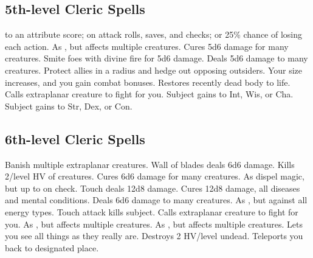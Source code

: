 \subsection{5th-level Cleric Spells}
\begin{spelllist}
    to an attribute score;  on attack rolls, saves, and checks; or 25\% chance of losing each action.
   As , but affects multiple creatures.
   Cures 5d6 damage for many creatures.
   Smite foes with divine fire for 5d6 damage.
   Deals 5d6 damage to many creatures.
   Protect allies in a \areamed radius and hedge out opposing outsiders.
   Your size increases, and you gain combat bonuses.
   Restores recently dead body to life.
   Calls extraplanar creature to fight for you.
   Subject gains  to Int, Wis, or Cha.
   Subject gains  to Str, Dex, or Con.
\end{spelllist}

\subsection{6th-level Cleric Spells}
\begin{spelllist}
   Banish multiple extraplanar creatures. 
   Wall of blades deals 6d6 damage.
  \M Kills 2/level HV of creatures.
   Cures 6d6 damage for many creatures.
   As dispel magic, but up to  on check.
   Touch deals 12d8 damage.
   Cures 12d8 damage, all diseases and mental conditions.
   Deals 6d6 damage to many creatures.
   As , but against all energy types.
   Touch attack kills subject.
   Calls extraplanar creature to fight for you.
   As , but affects multiple creatures.
   As , but affects multiple creatures.
  \M Lets you see all things as they really are.
  \M Destroys 2 HV/level undead.
   Teleports you back to designated place.
\end{spelllist}

